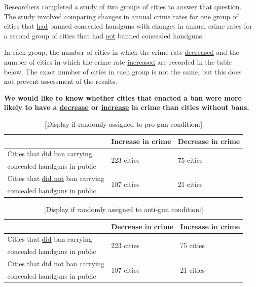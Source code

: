\documentclass[12pt, letterpaper]{article}
\begin{document}
\medskip
Researchers completed a study of two groups of cities to answer that question. The study involved comparing changes in annual crime rates for one group of cities that \uline{had} banned concealed handguns with changes in annual crime rates for a second group of cities that had \uline{not} banned concealed handguns.

\medskip
In each group, the number of cities in which the crime rate \uline{decreased} and the number of cities in which the crime rate \uline{increased} are recorded in the table below. The exact number of cities in each group is not the same, but this does not prevent assessment of the results.

\medskip
\textbf{We would like to know whether cities that enacted a ban were more likely to have a \underline{decrease} or \underline{increase} in crime than cities without bans.}

\begin{table}[h]
\centering
\caption*{{[}Display if randomly assigned to pro-gun condition:{]}} \label{tab:siprogun}
\begin{tabular}{|l|l|l|}
\hline 
  & Increase in crime  & Decrease in crime \\\hline
  Cities that \underline{did} ban carrying     & \multirow{2}{*}{223 cities} & \multirow{2}{*}{75 cities} \\ 
  concealed handguns in public           &               & \\ \hline
  Cities that \underline{did not} ban carrying & \multirow{2}{*}{107 cities} & \multirow{2}{*}{21 cities} \\ 
  concealed handguns in public           &               &  \\\hline
\end{tabular}
\end{table}

\vspace{-5mm}
\begin{table}[h]
\centering
\caption*{{[}Display if randomly assigned to anti-gun condition:{]}} \label{tab:siantigun}
\begin{tabular}{|l|l|l|}
\hline 
  & Decrease in crime & Increase in crime \\\hline
  Cities that \underline{did} ban carrying     & \multirow{2}{*}{223 cities} & \multirow{2}{*}{75 cities} \\ 
  concealed handguns in public           &               & \\ \hline
  Cities that \underline{did not} ban carrying & \multirow{2}{*}{107 cities} & \multirow{2}{*}{21 cities} \\ 
  concealed handguns in public           &               &  \\\hline
\end{tabular}
\end{table}
\end{document}
